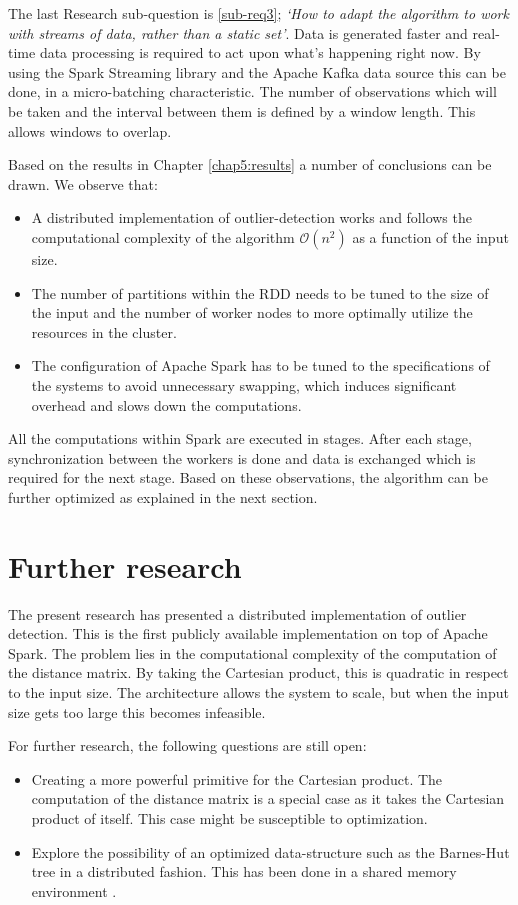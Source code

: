 The last Research sub-question is \ref{sub-req3}; \emph{`How to adapt the algorithm to work with streams of data, rather than a static set'}. Data is generated faster and real-time data processing is required to act upon what's happening right now. By using the Spark Streaming library and the Apache Kafka data source this can be done, in a micro-batching characteristic. The number of observations which will be taken and the interval between them is defined by a window length. This allows windows to overlap.

Based on the results in Chapter \ref{chap5:results} a number of conclusions can be drawn. We observe that:

\begin{itemize} 
    \item A distributed implementation of outlier-detection works and follows the computational complexity of the algorithm $\mathcal{O}(n^{2})$ as a function of the input size.
    \item The number of partitions within the RDD needs to be tuned to the size of the input and the number of worker nodes to more optimally utilize the resources in the cluster.
    \item The configuration of Apache Spark has to be tuned to the specifications of the systems to avoid unnecessary swapping, which induces significant overhead and slows down the computations.
\end{itemize}

All the computations within Spark are executed in stages. After each stage, synchronization between the workers is done and data is exchanged which is required for the next stage. Based on these observations, the algorithm can be further optimized as explained in the next section.

\section{Further research \label{sec:futherResearch}}
The present research has presented a distributed implementation of outlier detection. This is the first publicly available implementation on top of Apache Spark. The problem lies in the computational complexity of the computation of the distance matrix. By taking the Cartesian product, this is quadratic in respect to the input size. The architecture allows the system to scale, but when the input size gets too large this becomes infeasible.

For further research, the following questions are still open:
\begin{itemize}
    \item Creating a more powerful primitive for the Cartesian product. The computation of the distance matrix is a special case as it takes the Cartesian product of itself. This case might be susceptible to optimization.
    \item Explore the possibility of an optimized data-structure such as the Barnes-Hut tree \cite{Barnes1986} in a distributed fashion. This has been done in a shared memory environment \cite{Dubinski1996132}.
\end{itemize}

